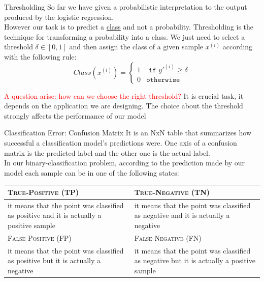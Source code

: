 \documentclass{beamer}
\newcommand{\sample}[2]{#1^{(#2)}}
\begin{document}
\begin{frame}{Thresholding}
So far we have given a probabilistic interpretation to the output produced by the logistic regression.\\
However our task is to predict a \underline{class} and not a probability.
\vskip 0.2cm
Thresholding is the technique for transforming a probability into a class.
We just need to select a threshold $\delta \in [0,1]$ and then assign the class of a 
given sample $\sample{x}{i}$ according with the following rule:
\[
	Class(\sample{x}{i}) = 
 \left\lbrace \begin{array}{cc} 1 &  \texttt{ if } \sample{y'}{i} \geq \delta \\ 0 & \texttt{otherwise} \end{array} \right.
\]
   
\pause
\textcolor{red}{A question arise: how can we choose the right threshold?}
\pause
It is crucial task, it depends on the application we are designing.
The choice about the threshold strongly affects the performance of our model
\end{frame}

\begin{frame}{Classification Error: Confusion Matrix}
It is an NxN table that summarizes how successful a classification model's predictions were.
One axis of a confusion matrix is the predicted label and the other one is the actual label.\\
In our binary-classification problem, according to the prediction made by
our model each sample can be in one of the following states:
\vskip 0.5cm
\pause
\begin{tabular}{|p{5cm}|p{5cm}|}
\hline
\textsc{True-Positive (TP)} & \textsc{True-Negative (TN)} \\
\hline
it means that the point was classified as positive and it is actually a positive sample &  it means that the point was classified as negative and it is actually a negative \\
\hline 

\textsc{False-Positive (FP)} & \textsc{False-Negative (FN)} \\
\hline
it means that the point was classified as positive but it is actually a negative &
it means that the point was classified as negative but it is actually a positive sample \\
\hline
\end{tabular}
\end{frame}
\end{document}

